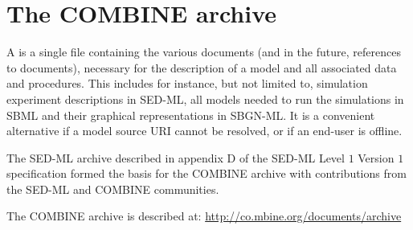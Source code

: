 \chapter{The COMBINE archive}
\label{app:archive}
A  is a single file containing the various documents
(and in the future, references to documents), necessary for the description of
a model and all associated data and procedures. This includes for instance, but
not limited to, simulation experiment descriptions in SED-ML, all models needed
to run the simulations in SBML and their graphical representations in SBGN-ML.
It is a convenient alternative if a model source URI cannot be resolved,  or if
an end-user is offline.

The SED-ML archive described in appendix D of the SED-ML Level $1$ Version $1$
specification formed the basis for the COMBINE archive with contributions from
the SED-ML and COMBINE communities.

The COMBINE archive is described at: \url{http://co.mbine.org/documents/archive}


